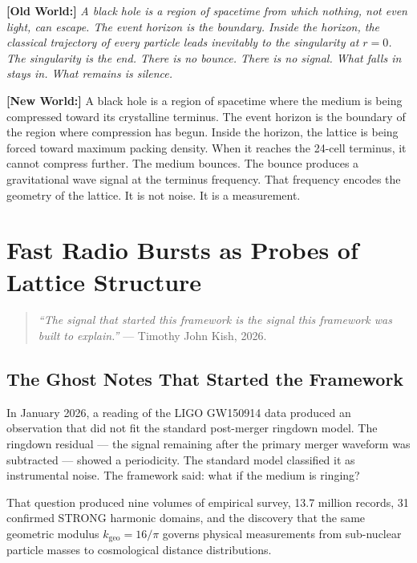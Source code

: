\documentclass[11pt, letterpaper, openany]{book}
\newcommand{\oldworld}[1]{\noindent\textbf{\color{goldseal}[Old World:]}
  \textit{#1}\medskip}
\newcommand{\newworld}[1]{\noindent\textbf{\color{kishblue}[New World:]}
  #1\medskip}
\begin{document}
\oldworld{A black hole is a region of spacetime from which nothing, not even
light, can escape. The event horizon is the boundary. Inside the horizon,
the classical trajectory of every particle leads inevitably to the singularity
at $r = 0$. The singularity is the end. There is no bounce. There is no signal.
What falls in stays in. What remains is silence.}

\newworld{A black hole is a region of spacetime where the medium is being
compressed toward its crystalline terminus. The event horizon is the boundary
of the region where compression has begun. Inside the horizon, the lattice
is being forced toward maximum packing density. When it reaches the 24-cell
terminus, it cannot compress further. The medium bounces. The bounce produces
a gravitational wave signal at the terminus frequency. That frequency encodes
the geometry of the lattice. It is not noise. It is a measurement.}

\clearpage
\chapter{Fast Radio Bursts as Probes of Lattice Structure}

\begin{quote}
\textit{``The signal that started this framework is the signal
this framework was built to explain.''} --- Timothy John Kish, 2026.
\end{quote}

\section{The Ghost Notes That Started the Framework}

In January 2026, a reading of the LIGO GW150914 data produced an observation
that did not fit the standard post-merger ringdown model. The ringdown
residual --- the signal remaining after the primary merger waveform was
subtracted --- showed a periodicity. The standard model classified it as
instrumental noise. The framework said: what if the medium is ringing?

That question produced nine volumes of empirical survey, 13.7 million records,
31 confirmed STRONG harmonic domains, and the discovery that the same geometric
modulus $k_\text{geo} = 16/\pi$ governs physical measurements from sub-nuclear
particle masses to cosmological distance distributions.
\end{document}
